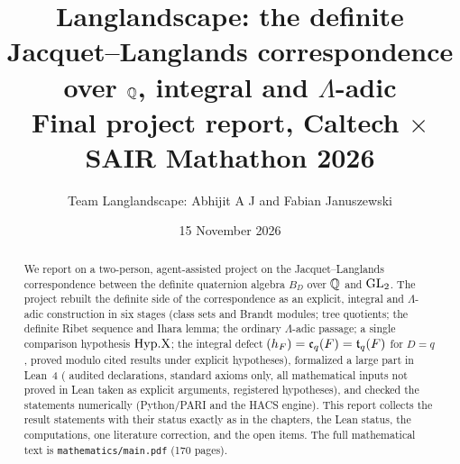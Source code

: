 \documentclass[11pt]{amsart}
\title[Langlandscape: final project report]{Langlandscape: the definite Jacquet--Langlands correspondence over $\mathbb{Q}$, integral and $\Lambda$-adic\\[2pt]
\normalsize Final project report, Caltech $\times$ SAIR Mathathon 2026}
\author[Abhijit A J and F. Januszewski]{Team Langlandscape: Abhijit A J and Fabian Januszewski}
\date{15 November 2026}
\newcommand{\mainpdf}{\texttt{mathematics/main.pdf}}
\begin{document}
\sloppy
\begin{abstract}
We report on a two-person, agent-assisted project on the Jacquet--Langlands correspondence between the definite
quaternion algebra $B_D$ over $\mathbb{Q}$ and $\mathrm{GL}_2$. The project rebuilt the definite side of the correspondence as an explicit,
integral and $\Lambda$-adic construction in six stages (class sets and Brandt modules; tree quotients; the definite Ribet
sequence and Ihara lemma; the ordinary $\Lambda$-adic passage; a single comparison hypothesis $\mathrm{Hyp.X}$; the integral defect
$(h_F)=\mathfrak{c}_q(F)=\mathfrak{t}_q(F)$ for $D=q$, proved modulo cited results under explicit hypotheses), formalized a large part in Lean~4 (\GateAudited{} audited declarations, standard axioms only, all
mathematical inputs not proved in Lean taken as explicit arguments, \NumHypRegistered{} registered hypotheses), and checked the statements numerically (Python/PARI and the HACS
engine). This report collects the result statements with their status exactly as in the chapters, the Lean status, the
computations, one literature correction, and the open items. The full mathematical text is \mainpdf{} (170 pages).
\end{abstract}
\maketitle
\setcounter{tocdepth}{1}
\tableofcontents











{\sloppy\printbibliography}

\appendix

\end{document}
